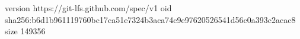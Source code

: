 version https://git-lfs.github.com/spec/v1
oid sha256:b6d1b961119760bc17ca51e7324b3aca74c9e97620526541d56c0a393c2acac8
size 149356
